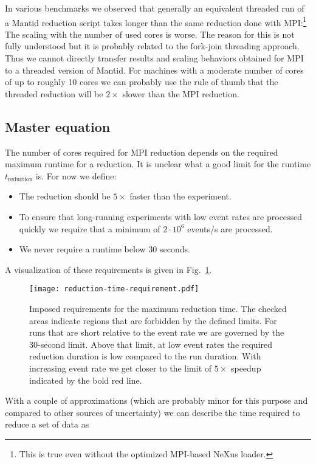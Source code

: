 \documentclass[a4paper,english,numbers=noenddot,bibliography=totoc,chapterprefix=on,DIV=12]{scrartcl}
\newcommand{\Treduction}{t_{\text{reduction}}}
\newcommand{\mantid}{Mantid\xspace}
\begin{document}
In various benchmarks we observed that generally an equivalent threaded run of a \mantid reduction script takes longer than the same reduction done with MPI:\footnote{This is true even without the optimized MPI-based NeXus loader.}
The scaling with the number of used cores is worse.
The reason for this is not fully understood but it is probably related to the fork-join threading approach.
Thus we cannot directly transfer results and scaling behaviors obtained for MPI to a threaded version of \mantid.
For machines with a moderate number of cores of up to roughly 10 cores we can probably use the rule of thumb that the threaded reduction will be $2\times$ slower than the MPI reduction.

\subsection{Master equation}

The number of cores required for MPI reduction depends on the required maximum runtime for a reduction.
It is unclear what a good limit for the runtime $\Treduction$ is.
For now we define:

\begin{itemize}
  \item The reduction should be $5\times$ faster than the experiment.
  \item To ensure that long-running experiments with low event rates are processed quickly we require that a minimum of $2\cdot10^6$ events/s are processed.
  \item We never require a runtime below 30 seconds.
\end{itemize}
A visualization of these requirements is given in Fig.~\ref{fig:reduction-time-requirement}.

\begin{figure}
  \centering
\texttt{[image: reduction-time-requirement.pdf]}
\caption{\label{fig:reduction-time-requirement}Imposed requirements for the maximum reduction time. The checked areas indicate regions that are forbidden by the defined limits. For runs that are short relative to the event rate we are governed by the 30-second limit. Above that limit, at low event rates the required reduction duration is low compared to the run duration. With increasing event rate we get closer to the limit of $5\times$ speedup indicated by the bold red line.}
\end{figure}

With a couple of approximations (which are probably minor for this purpose and compared to other sources of uncertainty) we can describe the time required to reduce a set of data as
\end{document}
